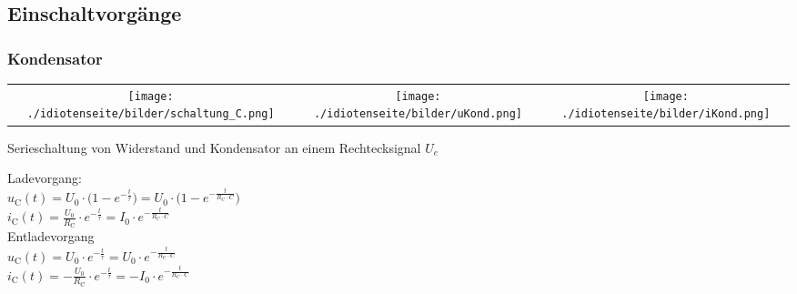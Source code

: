 \subsection{Einschaltvorgänge}
\subsubsection{Kondensator}
\begin{tabular}{ccc}
	\texttt{[image: ./idiotenseite/bilder/schaltung\_C.png]} &
	\texttt{[image: ./idiotenseite/bilder/uKond.png]} &
	\texttt{[image: ./idiotenseite/bilder/iKond.png]}\\
\end{tabular}
Serieschaltung von Widerstand und Kondensator an einem Rechtecksignal $U_e$
\begin{multicols}{2}		
	Ladevorgang:\\
	$u_{\mathrm{C}} (t) = U_0 \cdot \biggl(1 - e^{- \frac{t}{\tau}}\biggr) = U_0
	\cdot \biggl(1 - e^{- \frac{t}{R_{\mathrm{C}} \cdot C}}\biggr)$\\
	$i_{\mathrm{C}} (t) = \frac{U_0}{R_{\mathrm{C}}} \cdot e^{- \frac{t}{\tau}} =
	I_0 \cdot e^{- \frac{t}{R_{\mathrm{C}} \cdot C}}$\\
	\newline
	Entladevorgang\\
	$u_{\mathrm{C}} (t) = U_0 \cdot e^{- \frac{t}{\tau}} = U_0 \cdot e^{-
	\frac{t}{R_{\mathrm{C}} \cdot C}}$\\
	$i_{\mathrm{C}} (t) = -	\frac{U_0}{R_{\mathrm{C}}} \cdot e^{- \frac{t}{\tau}}
	= - I_0 \cdot e^{-\frac{t}{R_{\mathrm{C}} \cdot C}}$\\
\end{multicols}
